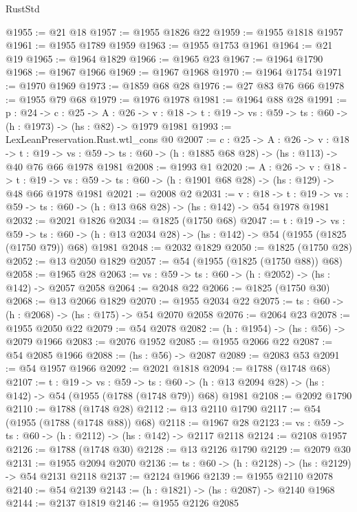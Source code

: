 \begin{lexlean}{RustStd}
\begin{coremodule}
@1955 := @21 @18
@1957 := @1955 @1826 @22
@1959 := @1955 @1818 @1957
@1961 := @1955 @1789 @1959
@1963 := @1955 @1753 @1961
@1964 := @21 @19
@1965 := @1964 @1829
@1966 := @1965 @23
@1967 := @1964 @1790
@1968 := @1967 @1966
@1969 := @1967 @1968
@1970 := @1964 @1754
@1971 := @1970 @1969
@1973 := @1859 @68 @28
@1976 := @27 @83 @76 @66
@1978 := @1955 @79 @68
@1979 := @1976 @1978
@1981 := @1964 @88 @28
@1991 := {p : @24} ->
  {c : @25} ->
  {A : @26} ->
  {v : @18} -> {t : @19} -> {vs : @59} -> {ts : @60} -> (h : @1973) -> (hs : @82) -> @1979 @1981
@1993 := LexLeanPreservation.Rust.wtl_cons @0
@2007 := {c : @25} ->
  {A : @26} ->
  {v : @18} ->
  {t : @19} ->
  {vs : @59} -> {ts : @60} -> (h : @1885 @68 @28) -> (hs : @113) -> @40 @76 @66 @1978 @1981
@2008 := @1993 @1
@2020 := {A : @26} ->
  {v : @18} ->
  {t : @19} -> {vs : @59} -> {ts : @60} -> (h : @1901 @68 @28) -> (hs : @129) -> @48 @66 @1978 @1981
@2021 := @2008 @2
@2031 := {v : @18} ->
  {t : @19} -> {vs : @59} -> {ts : @60} -> (h : @13 @68 @28) -> (hs : @142) -> @54 @1978 @1981
@2032 := @2021 @1826
@2034 := @1825 (@1750 @68)
@2047 := {t : @19} ->
  {vs : @59} ->
  {ts : @60} -> (h : @13 @2034 @28) -> (hs : @142) -> @54 (@1955 (@1825 (@1750 @79)) @68) @1981
@2048 := @2032 @1829
@2050 := @1825 (@1750 @28)
@2052 := @13 @2050 @1829
@2057 := @54 (@1955 (@1825 (@1750 @88)) @68)
@2058 := @1965 @28
@2063 := {vs : @59} -> {ts : @60} -> (h : @2052) -> (hs : @142) -> @2057 @2058
@2064 := @2048 @22
@2066 := @1825 (@1750 @30)
@2068 := @13 @2066 @1829
@2070 := @1955 @2034 @22
@2075 := {ts : @60} -> (h : @2068) -> (hs : @175) -> @54 @2070 @2058
@2076 := @2064 @23
@2078 := @1955 @2050 @22
@2079 := @54 @2078
@2082 := (h : @1954) -> (hs : @56) -> @2079 @1966
@2083 := @2076 @1952
@2085 := @1955 @2066 @22
@2087 := @54 @2085 @1966
@2088 := (hs : @56) -> @2087
@2089 := @2083 @53
@2091 := @54 @1957 @1966
@2092 := @2021 @1818
@2094 := @1788 (@1748 @68)
@2107 := {t : @19} ->
  {vs : @59} ->
  {ts : @60} -> (h : @13 @2094 @28) -> (hs : @142) -> @54 (@1955 (@1788 (@1748 @79)) @68) @1981
@2108 := @2092 @1790
@2110 := @1788 (@1748 @28)
@2112 := @13 @2110 @1790
@2117 := @54 (@1955 (@1788 (@1748 @88)) @68)
@2118 := @1967 @28
@2123 := {vs : @59} -> {ts : @60} -> (h : @2112) -> (hs : @142) -> @2117 @2118
@2124 := @2108 @1957
@2126 := @1788 (@1748 @30)
@2128 := @13 @2126 @1790
@2129 := @2079 @30
@2131 := @1955 @2094 @2070
@2136 := {ts : @60} -> (h : @2128) -> (hs : @2129) -> @54 @2131 @2118
@2137 := @2124 @1966
@2139 := @1955 @2110 @2078
@2140 := @54 @2139
@2143 := (h : @1821) -> (hs : @2087) -> @2140 @1968
@2144 := @2137 @1819
@2146 := @1955 @2126 @2085

\end{coremodule}
\end{lexlean}

